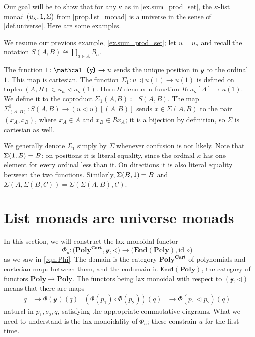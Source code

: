 \documentclass[11pt, one side, article]{memoir}
\theoremstyle{definition}
\theoremstyle{plain}
\newenvironment{example}
  {\pushQED{\qed}\renewcommand{\qedsymbol}{$\lozenge$}\examplex}
  {\popQED\endexamplex}
\newcommand{\Cat}[1]{\mathbf{#1}}%
\newcommand{\id}{\mathrm{id}}
\newcommand{\too}{\longrightarrow}
\newcommand{\en}{\Cat{End}}
\newcommand{\yon}{\mathcal{y}}
\newcommand{\poly}{\Cat{Poly}}
\newcommand{\polycart}{\poly^{\Cat{Cart}}}
\newcommand{\0}{\textsf{0}}
\newcommand{\1}{\tn{\textsf{1}}}
\newcommand{\tri}{\mathbin{\triangleleft}}
\begin{document}
Our goal will be to show that for any $\kappa$ as in \cref{ex.sum_prod_set}, the $\kappa$-list monad $(u_\kappa,\1,\Sigma)$ from \cref{prop.list_monad} is a universe in the sense of \cref{def.universe}. Here are some examples.

\begin{example}
We resume our previous example, \cref{ex.sum_prod_set}; let $u=u_\kappa$ and recall the notation $S(A,B)\cong\coprod_{a\in A}B_a$.

The function $\1\colon\yon\to u$ sends the unique position in $\yon$ to the ordinal $1$. This map is cartesian. The function $\Sigma_1\colon u\tri u(1)\to u(1)$ is defined on tuples $(A,B)\in u_\kappa\tri u_\kappa(1)$. Here $B$ denotes a function $B\colon u_\kappa[A]\to u(1)$. We define it to the coproduct $\Sigma_1(A,B)\coloneqq S(A,B)$. The map $\Sigma_{(A,B)}^\sharp\colon S(A,B)\to (u\tri u)[(A,B)]$ sends $x\in \Sigma(A,B)$ to the pair $(x_A,x_B)$, where $x_A\in A$ and $x_B\in B x_A$; it is a bijection by definition, so $\Sigma$ is cartesian as well.

We generally denote $\Sigma_1$ simply by $\Sigma$ whenever confusion is not likely. Note that $\Sigma(\1,B)=B$; on positions it is literal equality, since the ordinal $\kappa$ has one element for every ordinal less than it. On directions it is also literal equality between the two functions. Similarly, $\Sigma(B,\1)=B$ and $\Sigma(A,\Sigma(B,C))=\Sigma(\Sigma(A,B),C)$. 
\end{example}


\chapter{List monads are universe monads}

In this section, we will construct the lax monoidal functor
\[
	\Phi_u\colon\Big(\polycart,\yon,\tri\Big)\too\Big(\en(\poly),\id,\circ\Big)
\]
as we saw in \eqref{eqn.Phi}. The domain is the category $\polycart$ of polynomials and cartesian maps between them, and the codomain is $\en(\poly)$, the category of functors $\poly\to\poly$. The functors being lax monoidal with respect to $(\yon,\tri)$ means that there are maps
\begin{align*}
  q&\to\Phi(\yon)(q)
  &(\Phi(p_1)\circ\Phi(p_2))(q)&\to \Phi(p_1\tri p_2)(q)
\end{align*}
natural in $p_1,p_2,q$, satisfying the appropriate commutative diagrams.
What we need to understand is the lax monoidality of $\Phi_u$; these constrain $u$ for the first time.
\end{document}
